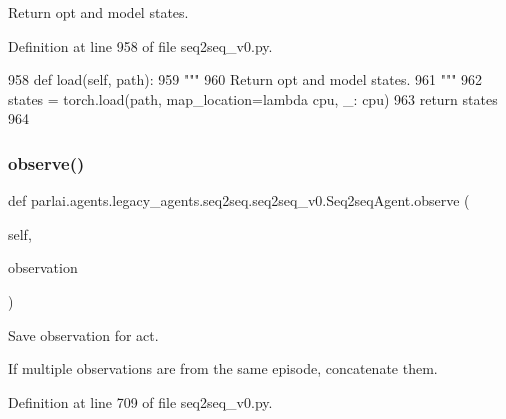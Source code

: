 \begin{DoxyVerb}Return opt and model states.
\end{DoxyVerb}
 

Definition at line 958 of file seq2seq\+\_\+v0.\+py.


\begin{DoxyCode}
958     \textcolor{keyword}{def }load(self, path):
959         \textcolor{stringliteral}{"""}
960 \textcolor{stringliteral}{        Return opt and model states.}
961 \textcolor{stringliteral}{        """}
962         states = torch.load(path, map\_location=\textcolor{keyword}{lambda} cpu, \_: cpu)
963         \textcolor{keywordflow}{return} states
964 
\end{DoxyCode}
\mbox{\label{classparlai_1_1agents_1_1legacy__agents_1_1seq2seq_1_1seq2seq__v0_1_1Seq2seqAgent_a8419a9652b14a16cedff86206a7bb613}} 
\subsubsection{\texorpdfstring{observe()}{observe()}}
{\footnotesize\ttfamily def parlai.\+agents.\+legacy\+\_\+agents.\+seq2seq.\+seq2seq\+\_\+v0.\+Seq2seq\+Agent.\+observe (\begin{DoxyParamCaption}\item[{}]{self,  }\item[{}]{observation }\end{DoxyParamCaption})}

\begin{DoxyVerb}Save observation for act.

If multiple observations are from the same episode, concatenate them.
\end{DoxyVerb}
 

Definition at line 709 of file seq2seq\+\_\+v0.\+py.


